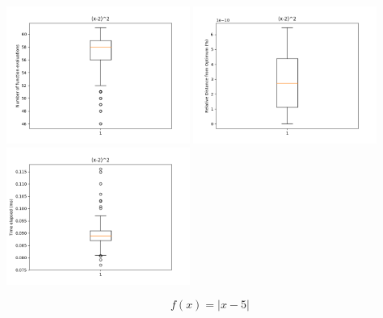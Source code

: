 \documentclass[11pt]{article}
\begin{document}
\begin{enumerate}
\begin{enumerate}
\includegraphics[width=6cm]{report_images/1d_func_1/Number_of_function_evaluations.png}
\includegraphics[width=6cm]{report_images/1d_func_1/Relative_Distance_from_Optimum.png}
\includegraphics[width=6cm]{report_images/1d_func_1/Time_elapsed.png}

\vspace{50mm}
\[f(x) = |x - 5|\]


\end{enumerate}
\end{enumerate}
\end{document}

